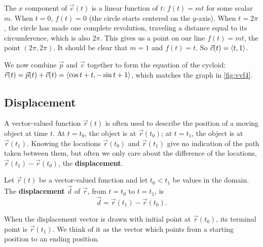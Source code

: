 \begin{example}
The $x$ component of $\vec c(t)$ is a linear function of $t$: $f(t) = mt$ for some scalar $m$. When $t=0$, $f(t) = 0$ (the circle starts centered on the $y$-axis). When $t=2\pi$, the circle has made one complete revolution, traveling a distance equal to its circumference, which is also $2\pi$. This gives us a point on our line $f(t) = mt$, the point $(2\pi, 2\pi)$. It should be clear that $m=1$ and $f(t) = t$. So $\vec c(t) =\left\langle t, 1\right\rangle$. 

We now combine $\vec p$ and $\vec c$ together to form the equation of the cycloid: $\vec r(t) = \vec p(t) + \vec c(t) =\left\langle \cos t+ t,-\sin t+1\right\rangle$, which
matches the graph in \autoref{fig:vvf4}.
\end{example}

\subsection{Displacement}

A vector-valued function $\vec r(t)$ is often used to describe the position of a moving object at time $t$. At $t=t_0$, the object is at $\vec r(t_0)$; at $t=t_1$, the object is at $\vec r(t_1)$. Knowing the locations $\vec r(t_0)$ and $\vec r(t_1)$ give no indication of the path taken between them, but often we only care about the difference of the locations, $\vec r(t_1)-\vec r(t_0)$, the \textbf{displacement}.

\begin{definition}[Displacement]\label{def:displacement}%
Let $\vec r(t)$ be a vector-valued function and let $t_0<t_1$ be values in the domain. The \textbf{displacement} $\vec d$ of $\vec r$, from $t=t_0$ to $t=t_1$, is \[\vec d=\vec r(t_1)-\vec r(t_0).\]
\end{definition}

When the displacement vector is drawn with initial point at $\vec r(t_0)$, its terminal point is $\vec r(t_1)$. We think of it as the vector which points from a starting position to an ending position.

